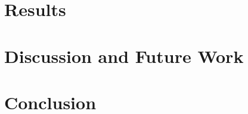 \documentclass[sigconf, anonymous]{acmart}
\begin{document}
\section{Results}
\label{sec:evaluation}



\section{Discussion and Future Work}
\label{sec:discussion}

\section{Conclusion}

\newpage



\end{document}

